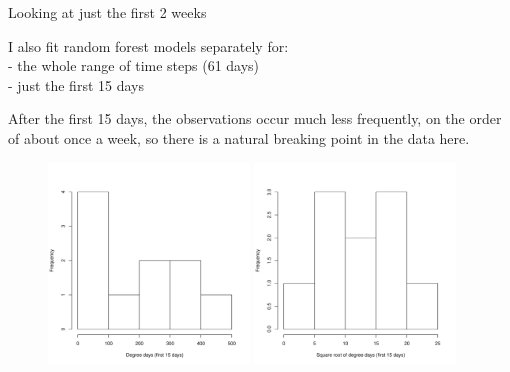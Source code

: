 \documentclass{beamer}
\begin{document}
\begin{frame}{Looking at just the first 2 weeks}

  {\scriptsize
    \noindent I also fit random forest models separately for:\\
    - the whole range of time steps (61 days)\\
    - just the first 15 days

    \vspace{0.05in}
    
    \noindent After the first 15 days, the observations occur much
    less frequently, on the order of about once a week, so there is a
    natural breaking point in the data here.
    
\begin{figure}
  \includegraphics[width=2.1in]{degdays_first_two_weeks_hist}
  \includegraphics[width=2.1in]{sqrt_degdays_first_two_weeks_hist}
\end{figure}
  }
  
\end{frame}
\end{document}
